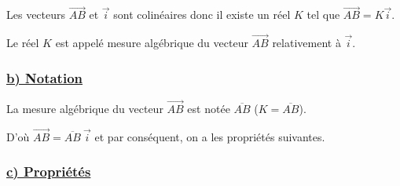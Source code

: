 \documentclass[12pt,a4paper]{article}
\begin{document}
\begin{center}
\end{center}

Les vecteurs $\overrightarrow{AB}$ et $\vec{i}$ sont colinéaires donc il existe un réel $K$ tel que $\overrightarrow{AB} = K\vec{i}$.

Le réel $K$ est appelé mesure algébrique du vecteur $\overrightarrow{AB}$ relativement à $\vec{i}$.

\subsubsection*{\centering \underline{\color{red}b) Notation}}

La mesure algébrique du vecteur $\overrightarrow{AB}$ est notée $\overline{AB}$ ($K = \overline{AB}$).

D'où $\overrightarrow{AB} = \overline{AB} \ \vec{i}$ et par conséquent, on a les propriétés suivantes.

\subsubsection*{\centering \underline{\color{red}c) Propriétés}}
\end{document}
